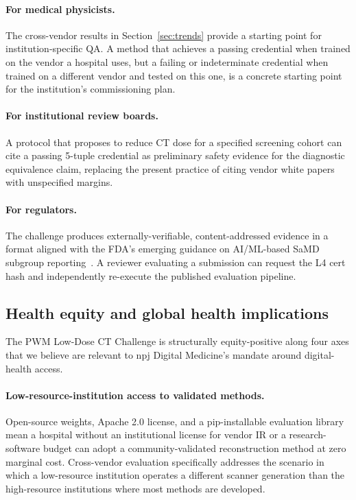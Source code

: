\documentclass[twoside,11pt]{article}
\begin{document}
\paragraph{For medical physicists.} The cross-vendor results in Section~\ref{sec:trends} provide a starting point for institution-specific QA. A method that achieves a passing credential when trained on the vendor a hospital uses, but a failing or indeterminate credential when trained on a different vendor and tested on this one, is a concrete starting point for the institution's commissioning plan.

\paragraph{For institutional review boards.} A protocol that proposes to reduce CT dose for a specified screening cohort can cite a passing 5-tuple credential as preliminary safety evidence for the diagnostic equivalence claim, replacing the present practice of citing vendor white papers with unspecified margins.

\paragraph{For regulators.} The challenge produces externally-verifiable, content-addressed evidence in a format aligned with the FDA's emerging guidance on AI/ML-based SaMD subgroup reporting~\citep{fda_aiml_2024}. A reviewer evaluating a submission can request the L4 cert hash and independently re-execute the published evaluation pipeline.

\subsection{Health equity and global health implications}

The PWM Low-Dose CT Challenge is structurally equity-positive along four axes that we believe are relevant to npj Digital Medicine's mandate around digital-health access.

\paragraph{Low-resource-institution access to validated methods.} Open-source weights, Apache 2.0 license, and a pip-installable evaluation library mean a hospital without an institutional license for vendor IR or a research-software budget can adopt a community-validated reconstruction method at zero marginal cost. Cross-vendor evaluation specifically addresses the scenario in which a low-resource institution operates a different scanner generation than the high-resource institutions where most methods are developed.
\end{document}
